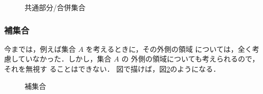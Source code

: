                     \begin{figure}[hbt]
                        \begin{center}
                            \caption{共通部分/合併集合}
                            \label{fig:shugo_rei}
                        \end{center}
                    \end{figure}

                \subsubsection{補集合}
                    今までは，例えば集合 $A$ を考えるときに，その外側の領域
                    については，全く考慮していなかった．しかし，集合 $A$ の
                    外側の領域についても考えられるので，それを無視す
                    ることはできない．
                    図で描けば，図\ref{fig:ho_shugo}のようになる．
                        \begin{figure}[hbt]
                            \begin{center}
                                \caption{補集合}
                                \label{fig:ho_shugo}
                            \end{center}
                        \end{figure}

